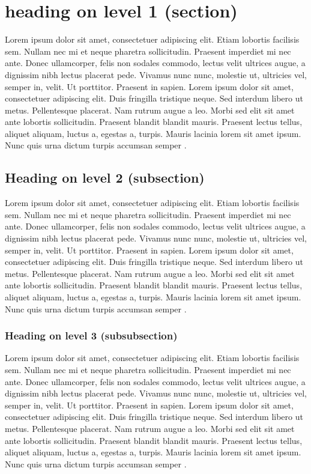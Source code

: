 \section{heading on level 1 (section)}

Lorem ipsum dolor sit amet, consectetuer adipiscing elit. Etiam lobortis facilisis sem. Nullam nec mi et neque pharetra sollicitudin. Praesent imperdiet mi nec ante. Donec ullamcorper, felis non sodales commodo, lectus velit ultrices augue, a dignissim nibh lectus placerat pede. Vivamus nunc nunc, molestie ut, ultricies vel, semper in, velit. Ut porttitor. Praesent in sapien. Lorem ipsum dolor sit amet, consectetuer adipiscing elit. Duis fringilla tristique neque. Sed interdum libero ut metus. Pellentesque placerat. Nam rutrum augue a leo. Morbi sed elit sit amet ante lobortis sollicitudin. Praesent blandit blandit mauris. Praesent lectus tellus, aliquet aliquam, luctus a, egestas a, turpis. Mauris lacinia lorem sit amet ipsum. Nunc quis urna dictum turpis accumsan semper \cite{example}.

\subsection{Heading on level 2 (subsection)}

Lorem ipsum dolor sit amet, consectetuer adipiscing elit. Etiam lobortis facilisis sem. Nullam nec mi et neque pharetra sollicitudin. Praesent imperdiet mi nec ante. Donec ullamcorper, felis non sodales commodo, lectus velit ultrices augue, a dignissim nibh lectus placerat pede. Vivamus nunc nunc, molestie ut, ultricies vel, semper in, velit. Ut porttitor. Praesent in sapien. Lorem ipsum dolor sit amet, consectetuer adipiscing elit. Duis fringilla tristique neque. Sed interdum libero ut metus. Pellentesque placerat. Nam rutrum augue a leo. Morbi sed elit sit amet ante lobortis sollicitudin. Praesent blandit blandit mauris. Praesent lectus tellus, aliquet aliquam, luctus a, egestas a, turpis. Mauris lacinia lorem sit amet ipsum. Nunc quis urna dictum turpis accumsan semper \cite{example}.

\subsubsection{Heading on level 3 (subsubsection)}

Lorem ipsum dolor sit amet, consectetuer adipiscing elit. Etiam lobortis facilisis sem. Nullam nec mi et neque pharetra sollicitudin. Praesent imperdiet mi nec ante. Donec ullamcorper, felis non sodales commodo, lectus velit ultrices augue, a dignissim nibh lectus placerat pede. Vivamus nunc nunc, molestie ut, ultricies vel, semper in, velit. Ut porttitor. Praesent in sapien. Lorem ipsum dolor sit amet, consectetuer adipiscing elit. Duis fringilla tristique neque. Sed interdum libero ut metus. Pellentesque placerat. Nam rutrum augue a leo. Morbi sed elit sit amet ante lobortis sollicitudin. Praesent blandit blandit mauris. Praesent lectus tellus, aliquet aliquam, luctus a, egestas a, turpis. Mauris lacinia lorem sit amet ipsum. Nunc quis urna dictum turpis accumsan semper \cite{example}.

